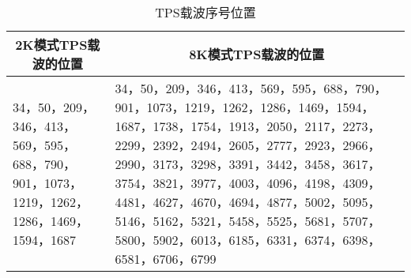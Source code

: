 \begin{table}[!htbp]
	\centering
	\caption{TPS载波序号位置}
	\begin{tabular}{|p{5cm}|p{5cm}|}
	\hline\hline
	\multicolumn{1}{|c|}{2K模式TPS载波的位置} & \multicolumn{1}{c|}{8K模式TPS载波的位置} \\
	\hline
	34，50，209，346，413，569，595，688，790，901，1073，1219，1262，1286，1469，1594，1687 & 34，50，209，346，413，569，595，688，790，901，1073，1219，1262，1286，1469，1594，1687，1738，1754，1913，2050，2117，2273，2299，2392，2494，2605，2777，2923，2966，2990，3173，3298，3391，3442，3458，3617，3754，3821，3977，4003，4096，4198，4309，4481，4627，4670，4694，4877，5002，5095，
5146，5162，5321，5458，5525，5681，5707，5800，5902，6013，6185，6331，6374，6398，6581，6706，6799 \\
	\hline\hline
	\end{tabular}
	\label{table:tps_carrier}
\end{table}

\endinput